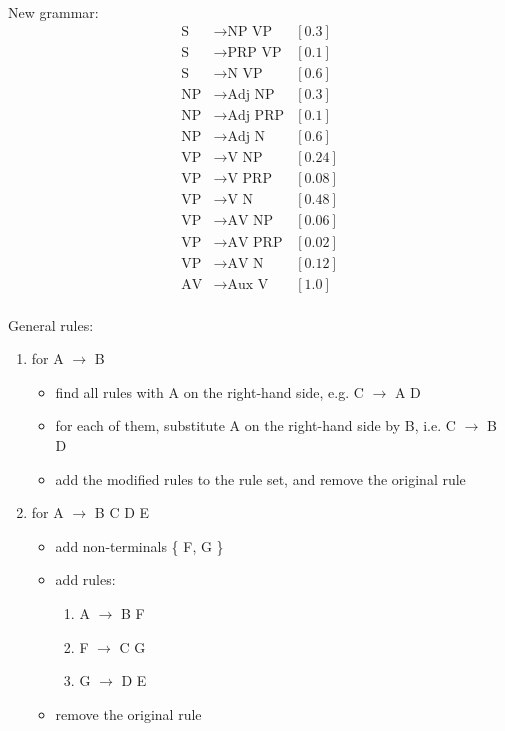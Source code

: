 \documentclass[twoside,11pt]{homework}
\begin{document}
\begin{solution}
  \

  New grammar:
  \[
    \begin{aligned}
      \text{S} &\rightarrow \text{NP VP} &[0.3]\\
      \text{S} &\rightarrow \text{PRP VP} &[0.1]\\
      \text{S} &\rightarrow \text{N VP} &[0.6]\\
      \hline
      \text{NP} &\rightarrow \text{Adj NP} &[0.3]\\
      \text{NP} &\rightarrow \text{Adj PRP} &[0.1]\\
      \text{NP} &\rightarrow \text{Adj N} &[0.6]\\
      \hline
      \text{VP} &\rightarrow \text{V NP} &[0.24]\\
      \text{VP} &\rightarrow \text{V PRP} &[0.08]\\
      \text{VP} &\rightarrow \text{V N} &[0.48]\\
      \text{VP} &\rightarrow \text{AV NP} &[0.06]\\
      \text{VP} &\rightarrow \text{AV PRP} &[0.02]\\
      \text{VP} &\rightarrow \text{AV N} &[0.12]\\
      \hline
      \text{AV} &\rightarrow \text{Aux V} &[1.0]\\
    \end{aligned}
  \]

  General rules:
  \begin{enumerate}
  \item for A $\rightarrow$ B
    \begin{itemize}
    \item find all rules with A on the right-hand side, e.g. C $\rightarrow$ A D
    \item for each of them, substitute A on the right-hand side by B,
      i.e. C $\rightarrow$ B D
    \item add the modified rules to the rule set, and remove the original rule
    \end{itemize}
  \item for A $\rightarrow$ B C D E
    \begin{itemize}
    \item add non-terminals \{ F, G \}
    \item add rules:
      \begin{enumerate}
      \item A $\rightarrow$ B F
      \item F $\rightarrow$ C G
      \item G $\rightarrow$ D E
      \end{enumerate}
    \item remove the original rule
    \end{itemize}
  \end{enumerate}
\end{solution}
\end{document}

